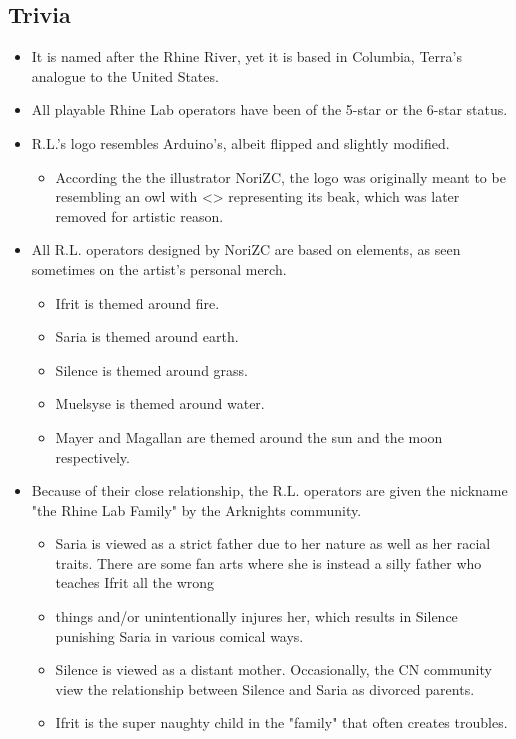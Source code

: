 \documentclass[12pt]{article}
\begin{document}
\begin{multicols}{2}
\section{Trivia}
\begin{itemize}
    \item It is named after the Rhine River, yet it is based in Columbia, Terra's analogue to the United States.
    \item All playable Rhine Lab operators have been of the 5-star or the 6-star status.
    \item R.L.'s logo resembles Arduino's, albeit flipped and slightly modified.
    \begin{itemize}
        \item According the the illustrator NoriZC, the logo was originally meant to be resembling an owl with <> representing its beak, which was later removed for artistic reason.
    \end{itemize}
    \item All R.L. operators designed by NoriZC are based on elements, as seen sometimes on the artist's personal merch.
    \begin{itemize}
        \item Ifrit is themed around fire.
        \item Saria is themed around earth.
        \item Silence is themed around grass.
        \item Muelsyse is themed around water.
        \item Mayer and Magallan are themed around the sun and the moon respectively\cite{8}.
    \end{itemize}
    \item Because of their close relationship, the R.L. operators are given the nickname "the Rhine Lab Family" by the Arknights community. 
    \begin{itemize}
        \item Saria is viewed as a strict father due to her nature as well as her racial traits. There are some fan arts where she is instead a silly father who teaches Ifrit all the wrong\item things and/or unintentionally injures her, which results in Silence punishing Saria in various comical ways.
        \item Silence is viewed as a distant mother. Occasionally, the CN community view the relationship between Silence and Saria as divorced parents.
        \item Ifrit is the super naughty child in the "family" that often creates troubles.

\end{itemize}
\end{itemize}
\end{multicols}
\end{document}

